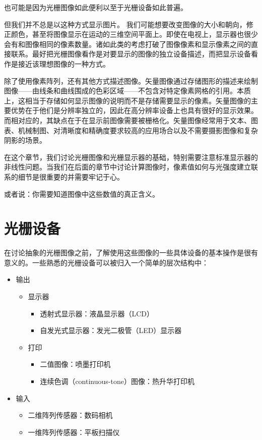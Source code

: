 \documentclass[lang=cn,12pt]{elegantbook}
\begin{document}
\begin{note}
也可能是因为光栅图像如此便利以至于光栅设备如此普遍。
\end{note}

但我们并不总是以这种方式显示图片。 我们可能想要改变图像的大小和朝向，修正颜色，甚至将图像显示在运动的三维空间平面上。即使在电视上，显示器也很少会有和图像相同的像素数量。诸如此类的考虑打破了图像像素和显示像素之间的直接联系。最好把光栅图像看作是对要显示的图像的独立设备描述，而把显示设备看作是接近该理想图像的一种方式。

除了使用像素阵列，还有其他方式描述图像。矢量图像通过存储图形的描述来绘制图像——由线条和曲线围成的色彩区域——不包含对特定像素网格的引用。本质上，这相当于存储如何显示图像的说明而不是存储需要显示的像素。矢量图像的主要优势在于他们是分辨率独立的，因此在高分辨率设备上也具有很好的显示效果。而相对应的，其缺点在于在显示前图像需要被栅格化。矢量图像经常用于文本、图表、机械制图、对清晰度和精确度要求较高的应用场合以及不需要摄影图像和复杂阴影的场景。

在这个章节，我们讨论光栅图像和光栅显示器的基础，特别需要注意标准显示器的非线性问题。当我们在后面的章节中讨论计算图像时，像素值如何与光强度建立联系的细节是很重要的并需要牢记于心。

\begin{note}
或者说：你需要知道图像中这些数值的真正含义。
\end{note}

\section{光栅设备}

在讨论抽象的光栅图像之前，了解使用这些图像的一些具体设备的基本操作是很有意义的。一些熟悉的光栅设备可以被归入一个简单的层次结构中：

\begin{itemize}
  \item 输出
\begin{itemize}
  \item 显示器
\begin{itemize}
  \item 透射式显示器：液晶显示器（LCD）
  \item 自发光式显示器：发光二极管（LED）显示器
\end{itemize}
  \item 打印
\begin{itemize}
  \item 二值图像：喷墨打印机
  \item 连续色调（continuous-tone）图像：热升华打印机
\end{itemize}
\end{itemize}
  \item 输入
\begin{itemize}
  \item 二维阵列传感器：数码相机
  \item 一维阵列传感器：平板扫描仪
\end{itemize}
\end{itemize}
\end{document}
